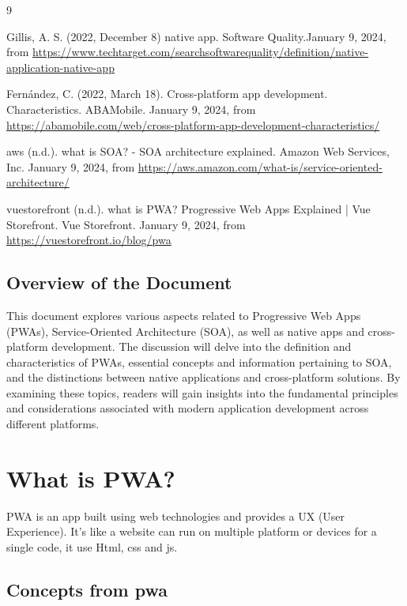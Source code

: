 \documentclass[12pt,a4paper, twosite]{article}
\begin{document}
\begin{thebibliography}
{9}

 Gillis, A. S. (2022, December 8)  native app. Software Quality.January 9, 2024, from \url{https://www.techtarget.com/searchsoftwarequality/definition/native-application-native-app}

 Fernández, C. (2022, March 18). Cross-platform app development. Characteristics. ABAMobile. January 9, 2024, from \url{https://abamobile.com/web/cross-platform-app-development-characteristics/}

 aws (n.d.). what is SOA? - SOA architecture explained. Amazon Web Services, Inc. January 9, 2024, from \url{https://aws.amazon.com/what-is/service-oriented-architecture/}

 vuestorefront (n.d.). what is PWA? Progressive Web Apps Explained | Vue Storefront. Vue Storefront. January 9, 2024, from \url{https://vuestorefront.io/blog/pwa}

\end{thebibliography}


\subsection{Overview of the Document}
\label{sec:orgdaca22c}

This document explores various aspects related to Progressive Web Apps (PWAs), Service-Oriented Architecture (SOA), as well as native apps and cross-platform development. The discussion will delve into the definition and characteristics of PWAs, essential concepts and information pertaining to SOA, and the distinctions between native applications and cross-platform solutions. By examining these topics, readers will gain insights into the fundamental principles and considerations associated with modern application development across different platforms.

\section{What is PWA?}
\label{sec:orgc1c4017}

PWA is an app built using web technologies and provides a UX (User Experience). It's like a website can run on multiple platform or devices for a single code, it use Html, css and js.

\subsection{Concepts from pwa}
\label{sec:org24980a8}
\end{document}
